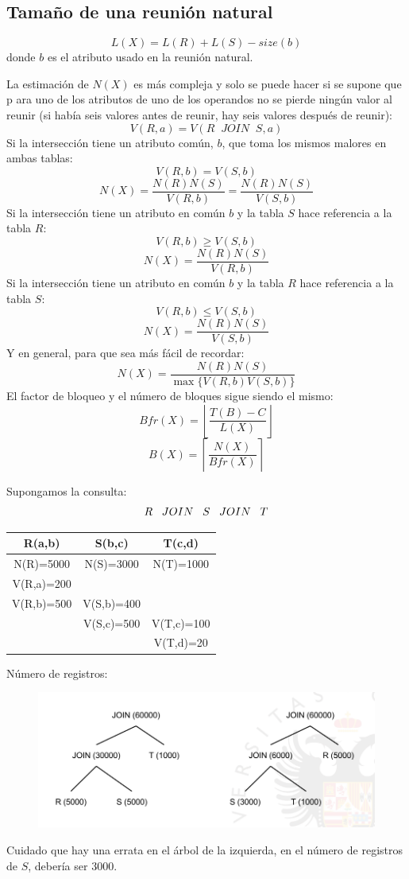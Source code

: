 \subsection{Tamaño de una reunión natural}
\[
L(X)=L(R)+L(S)-size(b)
\]
donde $b$ es el atributo usado en la reunión natural.

La estimación de $N(X)$ es más compleja y solo se puede hacer si se supone que p ara uno de los atributos de uno de los operandos no se pierde ningún valor al reunir (si había seis valores antes de reunir, hay seis valores después de reunir):
\[
V(R,a)=V(R\;\;JOIN\;\; S,a)
\]
Si la intersección tiene un atributo común, $b$, que toma los mismos malores en ambas tablas:
\[
V(R,b)=V(S,b)
\]
\[
N(X)=\frac{N(R)N(S)}{V(R,b)}=\frac{N(R)N(S)}{V(S,b)}
\]
Si la intersección tiene un atributo en común $b$ y la tabla $S$ hace referencia a la tabla $R$:
\[
V(R,b)\geq V(S,b)
\]
\[
N(X)=\frac{N(R)N(S)}{V(R,b)}
\]
Si la intersección tiene un atributo en común $b$ y la tabla $R$ hace referencia a la tabla $S$:
\[
V(R,b)\leq V(S,b)
\]
\[
N(X)=\frac{N(R)N(S)}{V(S,b)}
\]
Y en general, para que sea más fácil de recordar:
\[
N(X)=\frac{N(R)N(S)}{\max\{V(R,b)V(S,b)\}}
\]
El factor de bloqueo y el número de bloques sigue siendo el mismo:
\[
Bfr(X)=\left\lfloor\frac{T(B)-C}{L(X)}\right\rfloor
\]
\[
B(X)=\left\lceil\frac{N(X)}{Bfr(X)}\right\rceil
\]
\begin{example}
Supongamos la consulta:
\[
R \;\;\; JOIN \;\;\; S \;\;\; JOIN \;\;\; T
\]
\begin{center}
\begin{tabular}{|c|c|c|}
\hline 
R(a,b) & S(b,c) & T(c,d) \\ 
\hline 
N(R)=5000 & N(S)=3000 & N(T)=1000 \\ 
\hline 
V(R,a)=200 &   &   \\ 
\hline 
V(R,b)=500 & V(S,b)=400 &   \\ 
\hline 
  & V(S,c)=500 & V(T,c)=100 \\ 
\hline 
  &   & V(T,d)=20 \\ 
\hline 
\end{tabular} 
\end{center}
Número de registros:
\begin{figure}[H]
  \center
  \includegraphics[scale=0.4]{img/7.png}
\end{figure}
Cuidado que hay una errata en el árbol de la izquierda, en el número de registros de $S$, debería ser 3000.
\end{example}
